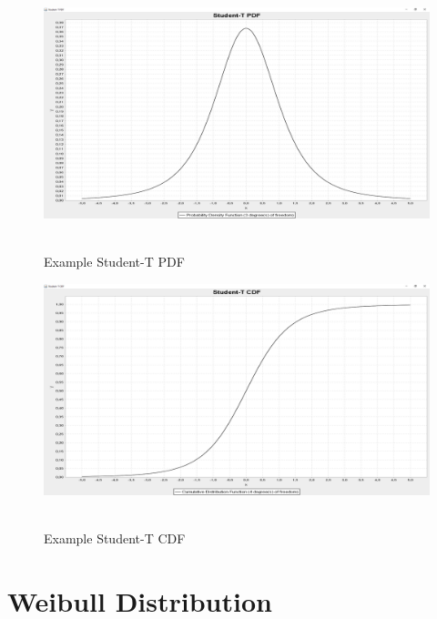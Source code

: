 		\begin{figure}[H]
			\centering
			\includegraphics[width=1\textwidth]{Figures/implemented_functions/student_pdf}~\\
			\caption{Example Student-T PDF}
			\label{fig:student_pdf}
		\end{figure}


		\begin{figure}[H]
			\centering
			\includegraphics[width=1\textwidth]{Figures/implemented_functions/student_cdf}~\\
			\caption{Example Student-T CDF}
			\label{fig:student_cdf}
		\end{figure}

		
	\section{Weibull Distribution}
	
